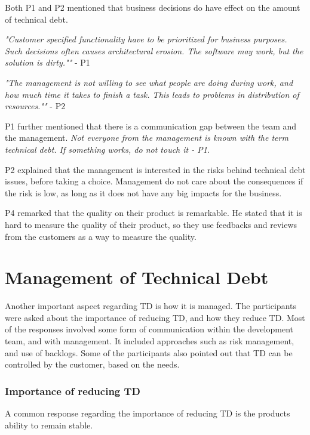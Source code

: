 Both P1 and P2 mentioned that business decisions do have effect on the amount of technical debt. 
\begin{displayquote}
\textit{"Customer specified functionality have to be prioritized for business purposes. Such decisions often causes architectural erosion. The software may work, but the solution is dirty.""} - P1
\end{displayquote}

\begin{displayquote}
\textit{"The management is not willing to see what people are doing during work, and how much time it takes to finish a task. This leads to problems in distribution of resources.""} - P2
\end{displayquote}

P1 further mentioned that there is a communication gap between the team and the management. \textit{Not everyone from the management is known with the term technical debt. If something works, do not touch it - P1}.

P2 explained that the management is interested in the risks behind technical debt issues, before taking a choice. Management do not care about the consequences if the risk is low, as long as it does not have any big impacts for the business. 

P4 remarked that the quality on their product is remarkable. He stated that it is hard to measure the quality of their product, so they use feedbacks and reviews from the customers as a way to measure the quality.

\section{Management of Technical Debt}
\label{sec:managing}
Another important aspect regarding TD is how it is managed. The participants were asked about the importance of reducing TD, and how they reduce TD. Most of the responses involved some form of communication within the development team, and with management. It included approaches such as risk management, and use of backlogs. Some of the participants also pointed out that TD can be controlled by the customer, based on the needs.

\subsubsection{Importance of reducing TD}
A common response regarding the importance of reducing TD is the products ability to remain stable.

